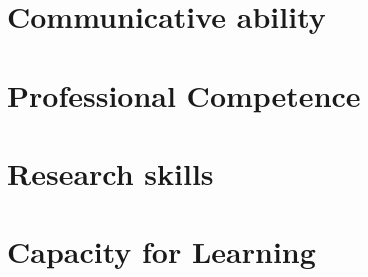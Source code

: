 \chapter{Communicative ability}
\label{sec:Communicative ability}


\chapter{Professional Competence}
\label{sec:professional_competence}


\chapter{Research skills}
\label{sec:research_skill}


\chapter{Capacity for Learning}
\label{sec:Learning}

